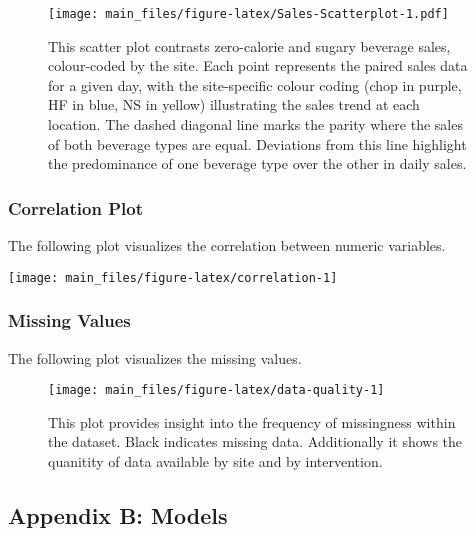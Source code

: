 \documentclass[
]{article}
\begin{document}
\begin{figure}
\centering
\texttt{[image: main\_files/figure-latex/Sales-Scatterplot-1.pdf]}
\caption{This scatter plot contrasts zero-calorie and sugary beverage
sales, colour-coded by the site. Each point represents the paired sales
data for a given day, with the site-specific colour coding (chop in
purple, HF in blue, NS in yellow) illustrating the sales trend at each
location. The dashed diagonal line marks the parity where the sales of
both beverage types are equal. Deviations from this line highlight the
predominance of one beverage type over the other in daily sales.}
\end{figure}

\hypertarget{correlation-plot-1}{%
\subsubsection{Correlation Plot}\label{correlation-plot-1}}

The following plot visualizes the correlation between numeric variables.

\begin{center}\texttt{[image: main\_files/figure-latex/correlation-1]} \end{center}

\hypertarget{missing-values}{%
\subsubsection{Missing Values}\label{missing-values}}

The following plot visualizes the missing values.

\begin{figure}

{\centering \texttt{[image: main\_files/figure-latex/data-quality-1]} 

}

\caption{This plot provides insight into the frequency of missingness within the dataset. Black indicates missing data. Additionally it shows the quanitity of data available by site and by intervention.}\label{fig:data-quality}
\end{figure}

\pagebreak

\hypertarget{appendix-b-models}{%
\subsection{Appendix B: Models}\label{appendix-b-models}}
\end{document}
